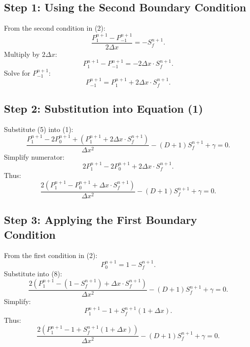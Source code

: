 \documentclass{article}
\begin{document}
\subsection{Step 1: Using the Second Boundary Condition}
From the second condition in (2):
\begin{equation}
\frac{P_1^{n+1} - P_{-1}^{n+1}}{2\Delta x} = -S_f^{n+1}.
\end{equation}
Multiply by $2\Delta x$:
\begin{equation}
P_1^{n+1} - P_{-1}^{n+1} = -2\Delta x \cdot S_f^{n+1}.
\end{equation}
Solve for $P_{-1}^{n+1}$:
\begin{equation}
P_{-1}^{n+1} = P_1^{n+1} + 2\Delta x \cdot S_f^{n+1}.
\end{equation}

\subsection{Step 2: Substitution into Equation (1)}
Substitute (5) into (1):
\begin{equation}
\frac{P_1^{n+1} - 2P_0^{n+1} + (P_1^{n+1} + 2\Delta x \cdot S_f^{n+1})}{\Delta x^2} - (D + 1) S_f^{n+1} + \gamma = 0.
\end{equation}
Simplify numerator:
\begin{equation}
2P_1^{n+1} - 2P_0^{n+1} + 2\Delta x \cdot S_f^{n+1}.
\end{equation}
Thus:
\begin{equation}
\frac{2(P_1^{n+1} - P_0^{n+1} + \Delta x \cdot S_f^{n+1})}{\Delta x^2} - (D + 1) S_f^{n+1} + \gamma = 0.
\end{equation}

\subsection{Step 3: Applying the First Boundary Condition}
From the first condition in (2):
\begin{equation}
P_0^{n+1} = 1 - S_f^{n+1}.
\end{equation}
Substitute into (8):
\begin{equation}
\frac{2(P_1^{n+1} - (1 - S_f^{n+1}) + \Delta x \cdot S_f^{n+1})}{\Delta x^2} - (D + 1) S_f^{n+1} + \gamma = 0.
\end{equation}
Simplify:
\begin{equation}
P_1^{n+1} - 1 + S_f^{n+1}(1 + \Delta x).
\end{equation}
Thus:
\begin{equation}
\frac{2(P_1^{n+1} - 1 + S_f^{n+1}(1 + \Delta x))}{\Delta x^2} - (D + 1) S_f^{n+1} + \gamma = 0.
\end{equation}
\end{document}
